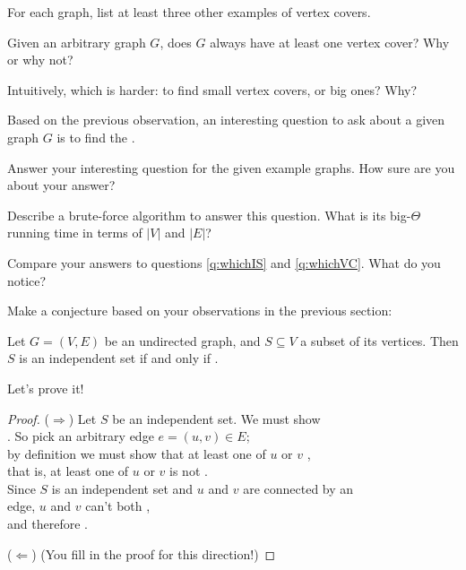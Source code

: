 \documentclass{tufte-handout}
\begin{document}
\begin{questions}
\item For each graph, list at least three other examples of
  vertex covers.

\item Given an arbitrary graph $G$, does $G$ always have at least one
  vertex cover?  Why or why not?

\item Intuitively, which is harder: to find small vertex covers, or
  big ones?  Why?

\item Based on the previous observation, an interesting question to
  ask about a given graph $G$ is to find the \blank.

\item Answer your interesting question for the given example graphs.
  How sure are you about your answer?

\item Describe a brute-force algorithm to answer this question.  What
  is its big-$\Theta$ running time in terms of $|V|$ and $|E|$?

\item Compare your answers to questions \ref{q:whichIS} and
  \ref{q:whichVC}.  What do you notice?
\end{questions}

Make a conjecture based on your observations in the previous section:

\begin{thm}
  Let $G = (V,E)$ be an undirected graph, and $S \subseteq V$ a subset
  of its vertices.  Then $S$ is an independent set if and only if \blank.
\end{thm}

\pause

\noindent Let's prove it!

\begin{proof}
  ($\Longrightarrow$) Let $S$ be an independent set.  We must show \\
  \blank. So pick an arbitrary edge $e = (u,v) \in E$; \\ by
  definition we must show that at least one of $u$ or $v$ \blank, \\
  that is, at least one of $u$ or $v$ is not \blank. \\
  Since $S$ is an independent set and $u$ and $v$ are connected by an \\
  edge, $u$ and $v$ can't both \blank, \\
  and therefore \blank. \medskip

  ($\Longleftarrow$) (You fill in the proof for this direction!)
\end{proof}
\end{document}

